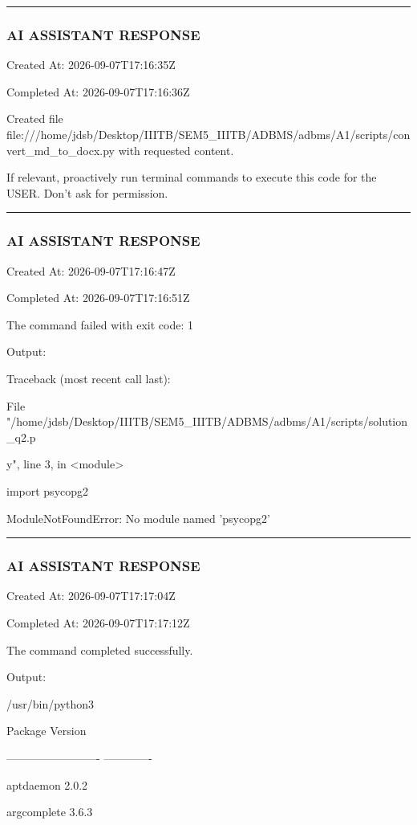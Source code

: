 \documentclass[11pt,a4paper]{article}
\begin{document}
\hrule

\subsubsection{AI ASSISTANT RESPONSE}

Created At: 2026-09-07T17:16:35Z

Completed At: 2026-09-07T17:16:36Z

Created file file:///home/jdsb/Desktop/IIITB/SEM5\_IIITB/ADBMS/adbms/A1/scripts/convert\_md\_to\_docx.py with requested content.

If relevant, proactively run terminal commands to execute this code for the USER. Don't ask for permission.


\hrule

\subsubsection{AI ASSISTANT RESPONSE}

Created At: 2026-09-07T17:16:47Z

Completed At: 2026-09-07T17:16:51Z


The command failed with exit code: 1

Output:

Traceback (most recent call last):

File "/home/jdsb/Desktop/IIITB/SEM5\_IIITB/ADBMS/adbms/A1/scripts/solution\_q2.p

y", line 3, in <module>

import psycopg2

ModuleNotFoundError: No module named 'psycopg2'


\hrule

\subsubsection{AI ASSISTANT RESPONSE}

Created At: 2026-09-07T17:17:04Z

Completed At: 2026-09-07T17:17:12Z


The command completed successfully.

Output:

/usr/bin/python3

Package                   Version

------------------------- -------------

aptdaemon                 2.0.2

argcomplete               3.6.3
\end{document}
